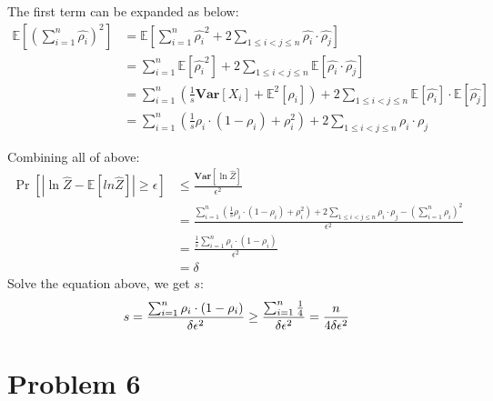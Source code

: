 \documentclass[a4paper, 12pt, titlepage]{article}
\begin{document}
The first term can be expanded as below:
\begin{equation}
    \begin{aligned}
        \mathbb E \left[ \left( \sum_{i = 1}^{n} \hat{\rho_{i}} \right)^2 \right] &= \mathbb E \left[ \sum_{i = 1}^{n} \hat{\rho_{i}}^2 + 2 \sum_{1 \leq i < j \leq n} \hat{\rho_{i}} \cdot \hat{\rho_{j}}\right] \\
                                                                                  &= \sum_{i = 1}^{n} \mathbb E \left[ \hat{\rho_{i}}^2 \right] + 2 \sum_{1 \leq i < j \leq n} \mathbb E \left[ \hat{\rho_{i}} \cdot \hat{\rho_{j}} \right] \\
                                                                                  &= \sum_{i = 1}^{n} \left( \frac{1}{s} \mathbf{Var} \left[ X_{i} \right] + \mathbb{E}^2 \left[ \rho_{i} \right] \right) + 2 \sum_{1 \leq i < j \leq n} \mathbb E \left[ \hat{\rho_{i}} \right] \cdot \mathbb E\left[ \hat{\rho_{j}} \right] \\
                                                                                  &= \sum_{i = 1}^{n} \left( \frac{1}{s} \rho_{i} \cdot \left( 1 - \rho_{i} \right) + \rho_{i}^2 \right) + 2 \sum_{1 \leq i < j \leq n} \rho_{i} \cdot \rho_{j}
    \end{aligned}
\end{equation}

Combining all of above:
\begin{equation}
    \begin{aligned}
        \Pr \left[ |\ln{\hat{Z}} - \mathbb E \left[ ln{\hat{Z}} \right] | \geq \epsilon \right] &\leq \frac{\mathbf{Var} \left[ \ln{\hat{Z}}\right] }{\epsilon^{2}} \\
                                                                                                &= \frac{\sum_{i = 1}^{n} \left( \frac{1}{s} \rho_{i} \cdot \left( 1 - \rho_{i} \right) + \rho_{i}^2 \right) + 2 \sum_{1 \leq i < j \leq n} \rho_{i} \cdot \rho_{j} - \left( \sum_{i = 1}^{n} \rho_{i} \right)^2 }{\epsilon^2} \\
                                                                                                &= \frac{\frac{1}{s} \sum_{i = 1}^{n} \rho_{i} \cdot \left( 1 - \rho_{i} \right)}{\epsilon^2} \\
                                                                                                &= \delta
    \end{aligned}
\end{equation}
Solve the equation above, we get $s$:
\[
    s = \frac{\sum_{i = 1}^{n} \rho_{i} \cdot \left( 1 - \rho_{i} \right)}{\delta \epsilon^2} \\
      \geq \frac{\sum_{i = 1}^{n} \frac{1}{4}}{\delta \epsilon^2} = \frac{n}{4 \delta \epsilon^2}
\]

\section{Problem 6}
\end{document}
